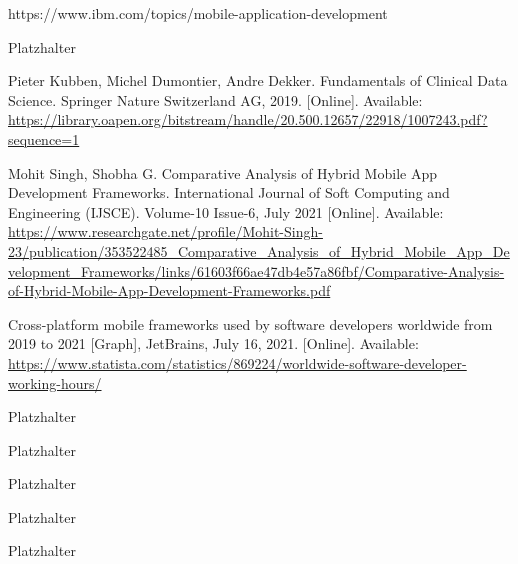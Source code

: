 https://www.ibm.com/topics/mobile-application-development

 Platzhalter

 Pieter Kubben, Michel Dumontier, Andre Dekker. Fundamentals of Clinical Data Science. Springer Nature Switzerland AG, 2019. [Online]. Available: \url{https://library.oapen.org/bitstream/handle/20.500.12657/22918/1007243.pdf?sequence=1}

 Mohit Singh, Shobha G. Comparative Analysis of Hybrid Mobile App Development Frameworks. International Journal of Soft Computing and Engineering (IJSCE). Volume-10 Issue-6, July 2021 [Online]. Available: \url{https://www.researchgate.net/profile/Mohit-Singh-23/publication/353522485_Comparative_Analysis_of_Hybrid_Mobile_App_Development_Frameworks/links/61603f66ae47db4e57a86fbf/Comparative-Analysis-of-Hybrid-Mobile-App-Development-Frameworks.pdf}

 Cross-platform mobile frameworks used by software developers worldwide from 2019 to 2021 [Graph], JetBrains, July 16, 2021. [Online]. Available: \url{https://www.statista.com/statistics/869224/worldwide-software-developer-working-hours/}


 Platzhalter

 Platzhalter

 Platzhalter

 Platzhalter

 Platzhalter